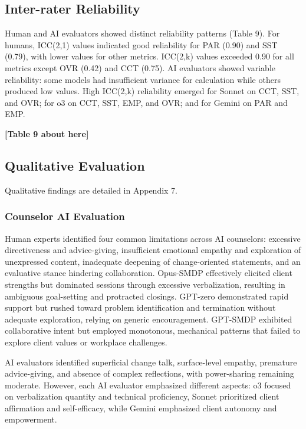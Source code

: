 \documentclass{wiley-article}
\begin{document}
\subsection*{Inter-rater Reliability}

Human and AI evaluators showed distinct reliability patterns (Table 9). For humans, ICC(2,1) values indicated good reliability for PAR (0.90) and SST (0.79), with lower values for other metrics. ICC(2,k) values exceeded 0.90 for all metrics except OVR (0.42) and CCT (0.75). AI evaluators showed variable reliability: some models had insufficient variance for calculation while others produced low values. High ICC(2,k) reliability emerged for Sonnet on CCT, SST, and OVR; for o3 on CCT, SST, EMP, and OVR; and for Gemini on PAR and EMP.

\begin{center}
\textbf{[Table 9 about here]}
\end{center}

\subsection*{Qualitative Evaluation}

Qualitative findings are detailed in Appendix 7.

\subsubsection*{Counselor AI Evaluation}

Human experts identified four common limitations across AI counselors: excessive directiveness and advice-giving, insufficient emotional empathy and exploration of unexpressed content, inadequate deepening of change-oriented statements, and an evaluative stance hindering collaboration. Opus-SMDP effectively elicited client strengths but dominated sessions through excessive verbalization, resulting in ambiguous goal-setting and protracted closings. GPT-zero demonstrated rapid support but rushed toward problem identification and termination without adequate exploration, relying on generic encouragement. GPT-SMDP exhibited collaborative intent but employed monotonous, mechanical patterns that failed to explore client values or workplace challenges.

AI evaluators identified superficial change talk, surface-level empathy, premature advice-giving, and absence of complex reflections, with power-sharing remaining moderate. However, each AI evaluator emphasized different aspects: o3 focused on verbalization quantity and technical proficiency, Sonnet prioritized client affirmation and self-efficacy, while Gemini emphasized client autonomy and empowerment.
\end{document}
